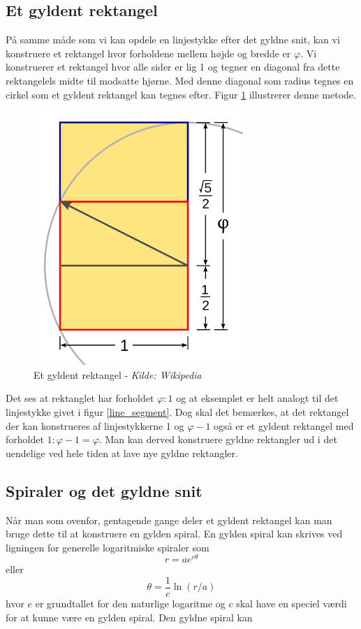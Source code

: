 {\subsection{Et gyldent rektangel}
På samme måde som vi kan opdele en linjestykke efter det gyldne snit,
kan vi konstruere et rektangel hvor forholdene mellem højde og bredde er
$\varphi$. Vi konstruerer et rektangel hvor alle sider er lig 1 og
tegner en diagonal fra dette rektangelels midte til modsatte hjørne. Med
denne diagonal som radius tegnes en cirkel som et gyldent rektangel kan
tegnes efter. Figur \ref{golden_rectangle} illustrerer denne metode.

\begin{figure}[h!]
	\begin{center}
		\includegraphics[scale=0.35,angle=0]{afsnit/baggrund/billeder/Golden_Rectangle_Construction}
	\end{center}
	\caption[Et gyldent rektangel]{Et gyldent rektangel - \emph{Kilde: Wikipedia}}
	\label{golden_rectangle}
\end{figure}
Det ses at rektanglet har forholdet $\varphi:1$ og at eksemplet er helt
analogt til det linjestykke givet i figur \ref{line_segment}. Dog skal
det bemærkes, at det rektangel der kan konstrueres af linjestykkerne 1
og $\varphi - 1$ også er et gyldent rektangel med forholdet $1:\varphi
-1 = \varphi$. Man kan derved konstruere gyldne rektangler ud i det
uendelige ved hele tiden at lave nye gyldne rektangler.

\subsection{Spiraler og det gyldne snit}
Når man som ovenfor, gentagende gange deler et gyldent rektangel kan man
bruge dette til at konstruere en gylden spiral. En gylden spiral kan
skrives ved ligningen for generelle logaritmiske spiraler som
\begin{equation}
	r = ae^{c\theta}
	\label{log_spiral_2}
\end{equation}
eller
\begin{equation}
	\theta = \frac{1}{c}\ln(r/a)
	\label{log_spiral_1}
\end{equation}
hvor $e$ er grundtallet for den naturlige logaritme og $c$ skal have en
speciel værdi for at kunne være en gylden spiral. Den gyldne spiral kan

}
